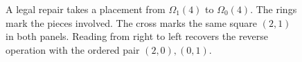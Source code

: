 \begin{figure}[htbp]
\centering
{}
\caption{A legal repair takes a placement from $\Omega_1(4)$ to $\Omega_0(4)$.
The rings mark the pieces involved. The cross marks the same square $(2,1)$ in both panels.
Reading from right to left recovers the reverse operation with the ordered pair $(2,0),(0,1)$.}
\label{fig:reparacion-tablero}
\end{figure}
